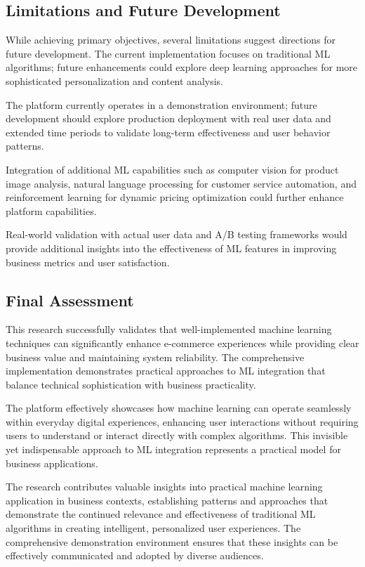 \documentclass[12pt]{article}
\begin{document}
\subsection{Limitations and Future Development}
While achieving primary objectives, several limitations suggest directions for future development. The current implementation focuses on traditional ML algorithms; future enhancements could explore deep learning approaches for more sophisticated personalization and content analysis.

The platform currently operates in a demonstration environment; future development should explore production deployment with real user data and extended time periods to validate long-term effectiveness and user behavior patterns.

Integration of additional ML capabilities such as computer vision for product image analysis, natural language processing for customer service automation, and reinforcement learning for dynamic pricing optimization could further enhance platform capabilities.

Real-world validation with actual user data and A/B testing frameworks would provide additional insights into the effectiveness of ML features in improving business metrics and user satisfaction.

\subsection{Final Assessment}
This research successfully validates that well-implemented machine learning techniques can significantly enhance e-commerce experiences while providing clear business value and maintaining system reliability. The comprehensive implementation demonstrates practical approaches to ML integration that balance technical sophistication with business practicality.

The platform effectively showcases how machine learning can operate seamlessly within everyday digital experiences, enhancing user interactions without requiring users to understand or interact directly with complex algorithms. This invisible yet indispensable approach to ML integration represents a practical model for business applications.

The research contributes valuable insights into practical machine learning application in business contexts, establishing patterns and approaches that demonstrate the continued relevance and effectiveness of traditional ML algorithms in creating intelligent, personalized user experiences. The comprehensive demonstration environment ensures that these insights can be effectively communicated and adopted by diverse audiences.
\end{document}
